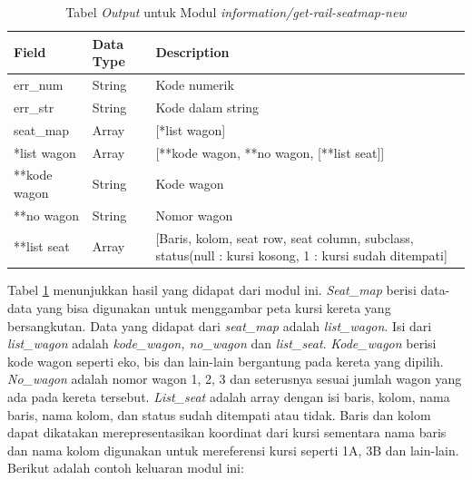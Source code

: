\begin{table}[H]
	\centering 
	\caption{Tabel \textit{Output} untuk Modul \textit{information/get-rail-seatmap-new}}
	\label{tab:getrailseatmapoutput}
	\begin{tabular}{|l|l|p{8cm}|}
		\hline
		Field & Data Type & Description\\
		\hline

		\hline
        err\_num & String & Kode numerik\\
        \hline
        err\_str & String & Kode dalam string\\
        \hline
        seat\_map & Array & [*list wagon]\\
        \hline
        \hline
        *list wagon & Array & [**kode wagon, **no wagon, [**list seat]]\\
        \hline
        **kode wagon & String & Kode wagon\\
        \hline
        **no wagon & String & Nomor wagon\\
        \hline
        **list seat & Array & [Baris, kolom, seat row, seat column, subclass, status(null : kursi kosong, 1 : kursi sudah ditempati]\\
        \hline
		
	\end{tabular} 
\end{table}

Tabel \ref{tab:getrailseatmapoutput} menunjukkan hasil yang didapat dari modul ini. \textit{Seat\_map} berisi data-data yang bisa digunakan untuk menggambar peta kursi kereta yang bersangkutan. Data yang didapat dari \textit{seat\_map} adalah \textit{list\_wagon}. Isi dari \textit{list\_wagon} adalah \textit{kode\_wagon, no\_wagon} dan \textit{list\_seat}. \textit{Kode\_wagon} berisi kode wagon seperti eko, bis dan lain-lain bergantung pada kereta yang dipilih. \textit{No\_wagon} adalah nomor wagon 1, 2, 3 dan seterusnya sesuai jumlah wagon yang ada pada kereta tersebut. \textit{List\_seat} adalah array dengan isi baris, kolom, nama baris, nama kolom, dan status sudah ditempati atau tidak. Baris dan kolom dapat dikatakan merepresentasikan koordinat dari kursi sementara nama baris dan nama kolom digunakan untuk mereferensi kursi seperti 1A, 3B dan lain-lain.\\

Berikut adalah contoh keluaran modul ini:

